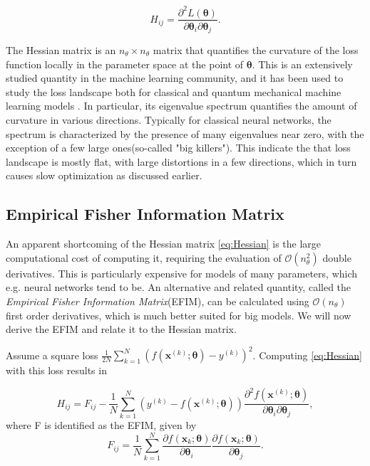 \begin{equation}
\label{eq:Hessian}
    H_{ij} = \frac{\partial^2 L(\boldsymbol{\theta})}{\partial \boldsymbol{\theta}_i\partial \boldsymbol{\theta}_j}.
\end{equation}

The Hessian matrix is an $n_\theta \times n_\theta$ matrix that quantifies the curvature of the loss function locally in the parameter space at the point of $\boldsymbol{\theta}$. This is an extensively studied quantity in the machine learning community, and it has been used to study the loss landscape both for classical and quantum mechanical machine learning models \cite{LeCun2012, Huembeli_2021}. In particular, its eigenvalue spectrum quantifies the amount of curvature in various directions. Typically for classical neural networks, the spectrum is characterized by the presence of many eigenvalues near zero, with the exception of a few large ones(so-called "big killers")\cite{LeCun2012}. This indicate the that loss landscape is mostly flat, with large distortions in a few directions, which in turn causes slow optimization as discussed earlier. 

\subsection{Empirical Fisher Information Matrix}\label{sec:EFIM}
An apparent shortcoming of the Hessian matrix \autoref{eq:Hessian} is the large computational cost of computing it, requiring the evaluation of $\mathcal{O}(n_\theta^2)$ double derivatives. This is particularly expensive for models of many parameters, which e.g. neural networks tend to be. An alternative and related quantity, called the \emph{Empirical Fisher Information Matrix}(EFIM)\cite{karakida2019universal}, can be calculated using $\mathcal{O}(n_\theta)$ first order derivatives, which is much better suited for big models. We will now derive the EFIM and relate it to the Hessian matrix.

Assume a square loss $\frac{1}{2N}\sum_{k=1}^{N} (f(\boldsymbol{x}^{(k)}; \boldsymbol{\theta}) - y^{(k)})^2$. Computing \autoref{eq:Hessian} with this loss results in 
    
\begin{equation}\label{eq:HessianSquareLoss}
    H_{ij} = F_{ij} -
    \frac{1}{N}\sum_{k=1}^{N} (y^{(k)} - f(\boldsymbol{x}^{(k)};\boldsymbol{\theta}))\frac{\partial^2 f(\boldsymbol{x}^{(k)};\boldsymbol{\theta})}{\partial \boldsymbol{\theta}_i\partial \boldsymbol{\theta}_j}, 
\end{equation}
where F is identified as the EFIM, given by
\begin{equation}
\label{eq:EmpiricalFisher}
    F_{ij} =  \frac{1}{N}\sum_{k=1}^{N}
    \frac{\partial f(\boldsymbol{x}_k;\boldsymbol{\theta})}{\partial \boldsymbol{\theta}_i}
    \frac{\partial f(\boldsymbol{x}_k;\boldsymbol{\theta})}{\partial \boldsymbol{\theta}_j}.
\end{equation}

